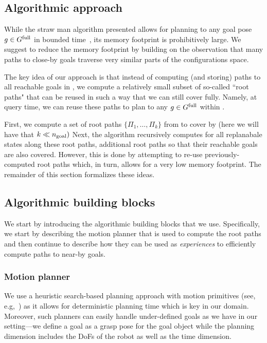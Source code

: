 \documentclass[conference]{IEEEtran}
\begin{document}
\subsection{Algorithmic approach}
While the straw man algorithm presented  allows for planning to any goal pose $ g \in G^{\textrm{full}}$ in bounded time~\Tbound, its memory footprint is prohibitively large.
%
We suggest to reduce the memory footprint by building on the observation that many paths to close-by goals traverse very similar parts of the configurations space.


The key idea of our approach is that instead of computing (and storing) paths to all reachable goals in \Gfull, we compute a relatively small subset of so-called ``root paths" that can be reused in such a way that we can still cover \Gfull fully. Namely, at query time, we can reuse these paths to plan to any $g\in G^{\textrm{full}}$ within \Tbound.


First, we compute a set of root paths $\{\Pi_1, \ldots, \Pi_k \}$ from \Shome to cover \Gfull by \Shome (here we will have that $k \ll n_{\rm goal})$ 
%
Next, the algorithm recursively computes for all replanabale states along these root paths, additional root paths so that their reachable goals are also covered. However, this is done by attempting to re-use previously-computed root paths which, in turn, allows for a very low memory footprint.
%
%
The remainder of this section formalizes these ideas.

\subsection{Algorithmic building blocks}
We start by introducing the algorithmic building blocks that we use.
Specifically, we start by describing the motion planner that is used to compute the root paths 
and then continue to describe how they can be used as \emph{experiences} to efficiently compute paths to near-by goals.
\subsubsection{Motion planner}
We use a heuristic search-based planning approach with motion primitives (see, e.g,~\cite{CCL10,CSCL11,LF09})
as it allows for deterministic planning time which is key in our domain.
Moreover, such planners can easily handle under-defined goals as we have in our setting---we define a goal as a grasp pose for the goal object while the planning dimension includes the DoFs of the robot as well as the time dimension.
\end{document}
